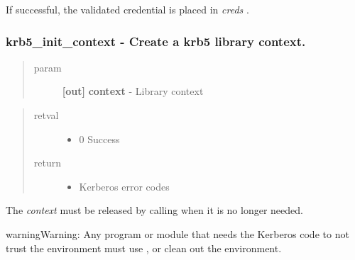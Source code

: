 \documentclass[letterpaper,10pt,english]{sphinxmanual}
\begin{document}
If successful, the validated credential is placed in \emph{creds} .


\subsubsection{krb5\_init\_context -  Create a krb5 library context.}
\label{appdev/refs/api/krb5_init_context:krb5-init-context-create-a-krb5-library-context}\label{appdev/refs/api/krb5_init_context::doc}

\begin{fulllineitems}
\label{appdev/refs/api/krb5_init_context:c.krb5_init_context}
\end{fulllineitems}

\begin{quote}\begin{description}
\item[{param}] \leavevmode
\textbf{{[}out{]}} \textbf{context} - Library context

\end{description}\end{quote}
\begin{quote}\begin{description}
\item[{retval}] \leavevmode\begin{itemize}
\item {} 
0   Success

\end{itemize}

\item[{return}] \leavevmode\begin{itemize}
\item {} 
Kerberos error codes

\end{itemize}

\end{description}\end{quote}

The \emph{context} must be released by calling {\hyperref[appdev/refs/api/krb5_free_context:c.krb5_free_context]{}} when it is no longer needed.

\begin{notice}{warning}{Warning:}
Any program or module that needs the Kerberos code to not trust the environment must use {\hyperref[appdev/refs/api/krb5_init_secure_context:c.krb5_init_secure_context]{}} , or clean out the environment.
\end{notice}
\end{document}
